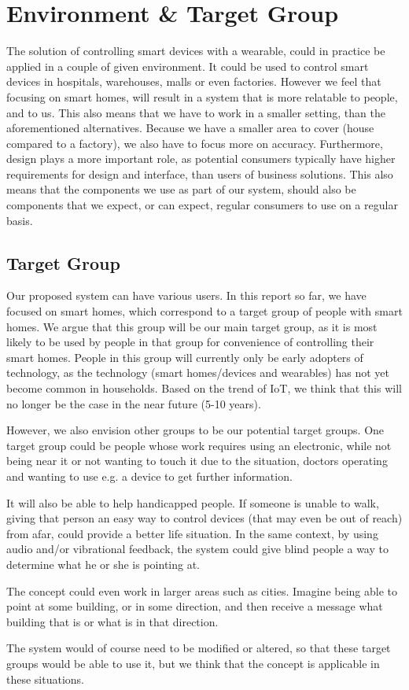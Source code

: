 \section{Environment \& Target Group}
The solution of controlling smart devices with a wearable, 
could in practice be applied in a couple of given environment.
It could be used to control smart devices in \eg hospitals, warehouses, malls or even factories. 
However we feel that focusing on smart homes, 
will result in a system that is more relatable to people, and to us.
This also means that we have to work in a smaller setting,
than the aforementioned alternatives. 
Because we have a smaller area to cover (house compared to \eg a factory),
we also have to focus more on accuracy. 
Furthermore, design plays a more important role,
as potential consumers typically have higher requirements for design and interface,
than users of business solutions. 
This also means that the components we use as part of our system,
should also be components that we expect, or can expect, 
regular consumers to use on a regular basis. 

\subsection{Target Group}
Our proposed system can have various users. 
In this report so far, we have focused on smart homes, 
which correspond to a target group of people with smart homes. 
We argue that this group will be our main target group, 
as it is most likely to be used by people in that group for convenience of controlling their smart homes. 
People in this group will currently only be early adopters of technology, 
as the technology (smart homes/devices and wearables) has not yet become common in households.
Based on the trend of IoT, we think that this will no longer be the case in the near future (5-10 years). 

However, we also envision other groups to be our potential target groups.
One target group could be people whose work requires using an electronic, 
while not being near it or not wanting to touch it due to the situation,
\eg doctors operating and wanting to use e.g. a device to get further information.

It will also be able to help handicapped people. 
If someone is unable to walk, 
giving that person an easy way to control devices (that may even be out of reach) from afar, 
could provide a better life situation. 
In the same context, by using audio and/or vibrational feedback, 
the system could give blind people a way to determine what he or she is pointing at. 

The concept could even work in larger areas such as cities. 
Imagine being able to point at some building, or in some direction, 
and then receive a message what building that is or what is in that direction. 

The system would of course need to be modified or altered, 
so that these target groups would be able to use it, 
but we think that the concept is applicable in these situations. 